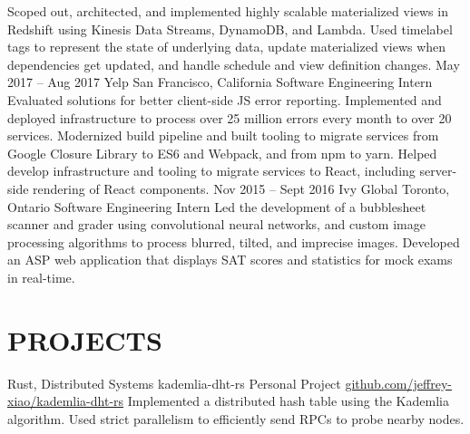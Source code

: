\documentclass{resume}
\begin{document}
\begin{main}
\begin{entrylist}
{            {%
              Scoped out, architected, and implemented highly scalable materialized views in %
              Redshift using Kinesis Data Streams, DynamoDB, and Lambda. %
            }%
            {%
              Used timelabel tags to represent the state of underlying data, update materialized %
              views when dependencies get updated, and handle schedule and view definition %
              changes. %
            }%
          }
        \rightentry%
          {May 2017 -- Aug 2017}%
          {Yelp}%
          {San Francisco, California}%
          {Software Engineering Intern}%
          {\createlist%
            {%
              Evaluated solutions for better client-side JS error reporting. %
            }%
            {%
              Implemented and deployed infrastructure to process over 25 million errors every %
              month to over 20 services. %
            }%
            {%
              Modernized build pipeline and built tooling to migrate services from Google Closure %
              Library to ES6 and Webpack, and from npm to yarn. %
            }%
            {%
              Helped develop infrastructure and tooling to migrate services to React, including %
              server-side rendering of React components. %
            }%
          }
        \rightentry%
          {Nov 2015 -- Sept 2016}%
          {Ivy Global}%
          {Toronto, Ontario}%
          {Software Engineering Intern}%
          {\createlist%
            {%
              Led the development of a bubblesheet scanner and grader using convolutional neural %
              networks, and custom image processing algorithms to process blurred, tilted, and %
              imprecise images. %
            }%
            {%
              Developed an ASP web application that displays SAT scores and statistics for mock %
              exams in real-time. %
            }%
          }
      \end{entrylist}
    \section{PROJECTS}
      \begin{entrylist}
        \rightentry%
          {Rust, Distributed Systems}%
          {kademlia-dht-rs}%
          {Personal Project}%
          {\href{https://github.com/jeffrey-xiao/kademlia-dht-rs}{github.com/jeffrey-xiao/kademlia-dht-rs}}%
          {\createlist%
            {%
              Implemented a distributed hash table using the Kademlia algorithm. %
            }%
            {%
              Used strict parallelism to efficiently send RPCs to probe nearby nodes. %
            }%
          }
      \end{entrylist}
  \end{main}
\end{document}
